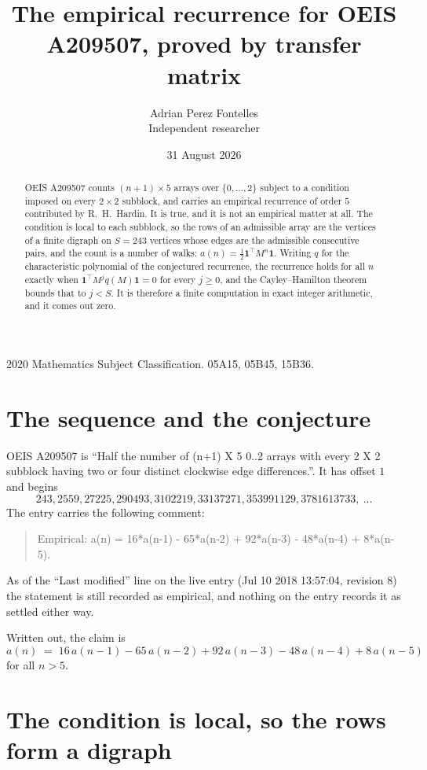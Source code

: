\documentclass[11pt,a4paper]{article}
\title{The empirical recurrence for OEIS A209507, proved by transfer matrix}
\author{Adrian Perez Fontelles\\ \small Independent researcher}
\date{31 August 2026}
\theoremstyle{plain}
\theoremstyle{definition}
\begin{document}
\maketitle

\begin{abstract}
OEIS A209507 counts $(n+1)\times5$ arrays over $\{0,\dots,2\}$ subject to a condition imposed on
every $2\times2$ subblock, and carries an empirical recurrence of order $5$ contributed
by R.~H.~Hardin. It is true, and it is not an empirical matter at all. The condition is local
to each subblock, so the rows of an admissible array are the vertices of a finite digraph
on $S=243$ vertices whose edges are the admissible consecutive pairs, and the count is a
number of walks: $a(n)=\tfrac1{2}\mathbf{1}^{\!\top}M^{n}\mathbf{1}$. Writing $q$
for the characteristic polynomial of the conjectured recurrence, the recurrence holds for all
$n$ exactly when $\mathbf{1}^{\!\top}M^{j}q(M)\mathbf{1}=0$ for every $j\ge0$, and the
Cayley--Hamilton theorem bounds that to $j<S$. It is therefore a finite computation in exact
integer arithmetic, and it comes out zero.
\end{abstract}

\noindent\small 2020 Mathematics Subject Classification. 05A15, 05B45, 15B36.\normalsize

\section{The sequence and the conjecture}

OEIS A209507 is ``Half the number of (n+1) X 5 0..2 arrays with every 2 X 2 subblock having two or four distinct clockwise edge differences.''. It has offset $1$ and begins
\[
243, 2559, 27225, 290493, 3102219, 33137271, 353991129, 3781613733,\ \dots
\]
The entry carries the following comment:
\begin{quote}\small
Empirical: a(n) = 16*a(n-1) - 65*a(n-2) + 92*a(n-3) - 48*a(n-4) + 8*a(n-5).
\end{quote}
As of the ``Last modified'' line on the live entry (Jul 10 2018 13:57:04, revision 8) the statement is
still recorded as empirical, and nothing on the entry records it as settled either way.

Written out, the claim is
\begin{equation}\label{eq:conj}
a(n)\;=\;16\,a(n-1) - 65\,a(n-2) + 92\,a(n-3) - 48\,a(n-4) + 8\,a(n-5)
\end{equation}
for all $n>5$.

\section{The condition is local, so the rows form a digraph}
\end{document}
